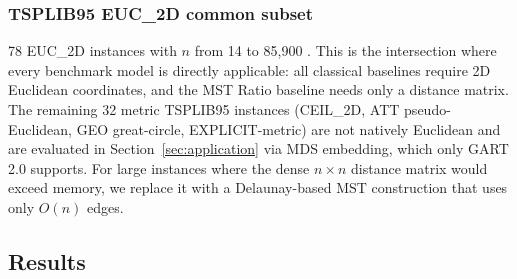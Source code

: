 \begin{table}[!ht]
\centering
\caption{2D benchmark dataset composition (2{,}580 instances).}
\label{tab:dataset_counts}
\end{table}

\subsubsection{TSPLIB95 EUC\_2D common subset}
78 EUC\_2D instances with $n$ from 14 to 85{,}900 \citep{reinelt1991tsplib}. This is the intersection where every benchmark model is directly applicable: all classical baselines require 2D Euclidean coordinates, and the MST Ratio baseline needs only a distance matrix. The remaining 32 metric TSPLIB95 instances (CEIL\_2D, ATT pseudo-Euclidean, GEO great-circle, EXPLICIT-metric) are not natively Euclidean and are evaluated in Section~\ref{sec:application} via MDS embedding, which only GART 2.0 supports. For large instances where the dense $n \times n$ distance matrix would exceed memory, we replace it with a Delaunay-based MST construction \citep{delaunay1934} that uses only $O(n)$ edges.

\subsection{Results} \label{subsec:results}

